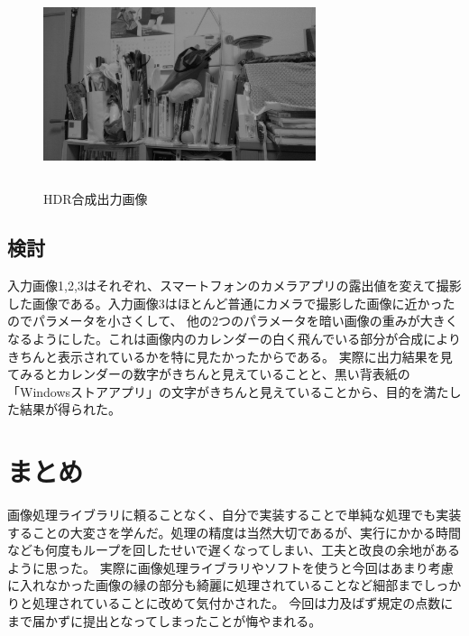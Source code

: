 \documentclass[11pt,a4j]{jsarticle}
\begin{document}
    \begin{figure}[H]
      \centering
      \includegraphics[clip,width=8.0cm ,height= 6.0cm]{./img/hdr/HDR.png}
      \caption{HDR合成出力画像\label{fig:hdr_result}}
    \end{figure}
    \subsection{検討}
    入力画像1,2,3はそれぞれ、スマートフォンのカメラアプリの露出値を変えて撮影した画像である。入力画像3はほとんど普通にカメラで撮影した画像に近かったのでパラメータを小さくして、
    他の2つのパラメータを暗い画像の重みが大きくなるようにした。これは画像内のカレンダーの白く飛んでいる部分が合成によりきちんと表示されているかを特に見たかったからである。
    実際に出力結果を見てみるとカレンダーの数字がきちんと見えていることと、黒い背表紙の「Windowsストアアプリ」の文字がきちんと見えていることから、目的を満たした結果が得られた。
    \section{まとめ}
    画像処理ライブラリに頼ることなく、自分で実装することで単純な処理でも実装することの大変さを学んだ。処理の精度は当然大切であるが、実行にかかる時間なども何度もループを回したせいで遅くなってしまい、工夫と改良の余地があるように思った。
    実際に画像処理ライブラリやソフトを使うと今回はあまり考慮に入れなかった画像の縁の部分も綺麗に処理されていることなど細部までしっかりと処理されていることに改めて気付かされた。
    今回は力及ばず規定の点数にまで届かずに提出となってしまったことが悔やまれる。
\end{document}
